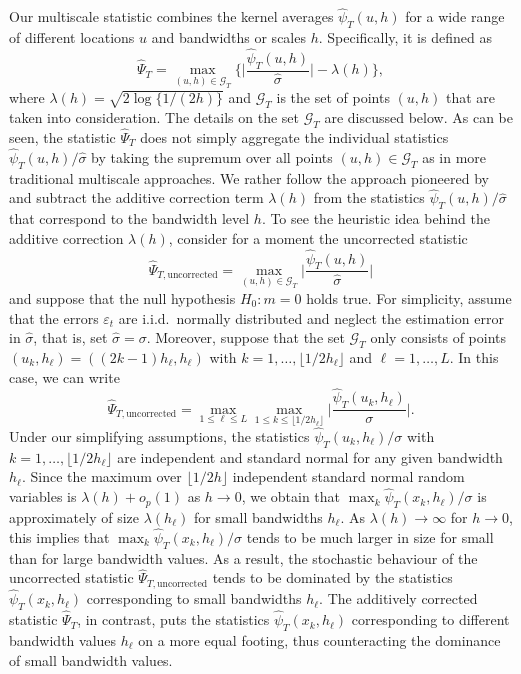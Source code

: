Our multiscale statistic combines the kernel averages $\widehat{\psi}_T(u,h)$ for a wide range of different locations $u$ and bandwidths or scales $h$. Specifically, it is defined as
\begin{equation}\label{multiscale-stat}
\widehat{\Psi}_T = \max_{(u,h) \in \mathcal{G}_T} \Big\{ \Big|\frac{\widehat{\psi}_T(u,h)}{\widehat{\sigma}}\Big| - \lambda(h) \Big\}, 
\end{equation} 
where $\lambda(h) = \sqrt{2 \log \{ 1/(2h) \}}$ and $\mathcal{G}_T$ is the set of points $(u,h)$ that are taken into consideration. The details on the set $\mathcal{G}_T$ are discussed below. As can be seen, the statistic $\widehat{\Psi}_T$ does not simply aggregate the individual statistics $\widehat{\psi}_T(u,h)/\widehat{\sigma}$ by taking the supremum over all points $(u,h) \in \mathcal{G}_T$ as in more traditional multiscale approaches. We rather follow the approach pioneered by \cite{DuembgenSpokoiny2001} and subtract the additive correction term $\lambda(h)$ from the statistics $\widehat{\psi}_T(u,h)/\widehat{\sigma}$ that correspond to the bandwidth level $h$. To see the heuristic idea behind the additive correction $\lambda(h)$, consider for a moment the uncorrected statistic
\[ \widehat{\Psi}_{T,\text{uncorrected}} = \max_{(u,h) \in \mathcal{G}_T} \Big|\frac{\widehat{\psi}_T(u,h)}{\widehat{\sigma}}\Big| \]
and suppose that the null hypothesis $H_0: m = 0$ holds true. For simplicity, assume that the errors $\varepsilon_t$ are i.i.d.\ normally distributed and neglect the estimation error in $\widehat{\sigma}$, that is, set $\widehat{\sigma} = \sigma$. Moreover, suppose that the set $\mathcal{G}_T$ only consists of points $(u_k,h_\ell) = ((2k - 1)h_\ell,h_\ell)$ with $k = 1,\ldots,\lfloor 1/2h_\ell \rfloor$ and $\ell = 1,\ldots,L$. In this case, we can write
\[ \widehat{\Psi}_{T,\text{uncorrected}} = \max_{1 \le \ell \le L} \max_{1 \le k \le \lfloor 1/2h_\ell \rfloor} \Big|\frac{\widehat{\psi}_T(u_k,h_\ell)}{\sigma}\Big|. \]
Under our simplifying assumptions, the statistics $\widehat{\psi}_T(u_k,h_\ell)/\sigma$ with $k = 1,\ldots,\lfloor 1/2h_\ell \rfloor$ are independent and standard normal for any given bandwidth $h_\ell$. Since the maximum over $\lfloor 1/2h \rfloor$ independent standard normal random variables is $\lambda(h) + o_p(1)$ as $h \rightarrow 0$, we obtain that $\max_{k} \widehat{\psi}_T(x_k,h_\ell)/\sigma$ is approximately of size $\lambda(h_\ell)$ for small bandwidths $h_\ell$. As $\lambda(h) \rightarrow \infty$ for $h \rightarrow 0$, this implies that $\max_{k} \widehat{\psi}_T(x_k,h_\ell)/\sigma$ tends to be much larger in size for small than for large bandwidth values. As a result, the stochastic behaviour of the uncorrected statistic $\widehat{\Psi}_{T,\text{uncorrected}}$ tends to be dominated by the statistics $\widehat{\psi}_T(x_k,h_\ell)$ corresponding to small bandwidths $h_\ell$. The additively corrected statistic $\widehat{\Psi}_T$, in contrast, puts the statistics $\widehat{\psi}_T(x_k,h_\ell)$ corresponding to different bandwidth values $h_\ell$ on a more equal footing, thus counteracting the dominance of small bandwidth values. 


